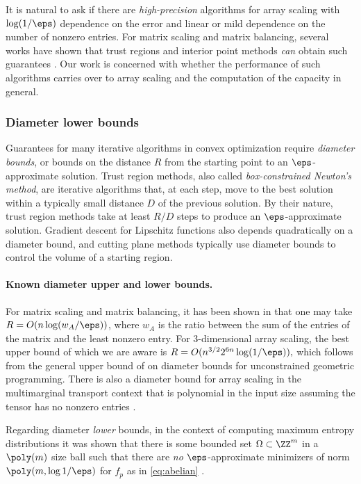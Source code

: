 It is natural to ask if there are \emph{high-precision} algorithms for array scaling with $\log(1/\eps)$ dependence on the error and linear or mild dependence on the number of nonzero entries. For matrix scaling and matrix balancing, several works have shown that trust regions and interior point methods \emph{can} obtain such guarantees \cite{cohen2017matrix,allen2017much}.
Our work is concerned with whether the performance of such algorithms carries over to array scaling and the computation of the capacity in general.



\subsubsection{Diameter lower bounds}

Guarantees for many iterative algorithms in convex optimization require \emph{diameter bounds}, or bounds on the distance $R$ from the starting point to an $\eps$-approximate solution. Trust region methods, also called \emph{box-constrained Newton's method}, are iterative algorithms that, at each step, move to the best solution within a typically small distance $D$ of the previous solution. By their nature, trust region methods take at least $R/D$ steps to produce an $\eps$-approximate solution. Gradient descent for Lipschitz functions also depends quadratically on a diameter bound, and cutting plane methods typically use diameter bounds to control the volume of a starting region.

\paragraph{Known diameter upper and lower bounds.}
For matrix scaling and matrix balancing, it has been shown in \cite{cohen2017matrix} that one may take $R = O(n \log(w_A/\eps))$, where $w_A$ is the ratio between the sum of the entries of the matrix and the least nonzero entry. For $3$-dimensional array scaling, the best upper bound of which we are aware is $R = O(n^{3/2} 2^{6n} \log (1/\eps)),$ which follows from the general upper bound of \cite{straszak2017computing} on diameter bounds for unconstrained geometric programming. There is also a diameter bound for array scaling in the multimarginal transport context that is polynomial in the input size assuming the tensor has no nonzero entries \cite{lin2019complexity}.

Regarding diameter \emph{lower} bounds, in the context of computing maximum entropy distributions it was shown that there is some bounded set $\Omega \subset \ZZ^m$ in a $\poly(m)$ size ball such that there are \emph{no} $\eps$-approximate minimizers of norm $\poly(m, \log 1/\eps)$ for $f_p$ as in \cref{eq:abelian}  \cite{straszak2017computing}. 

